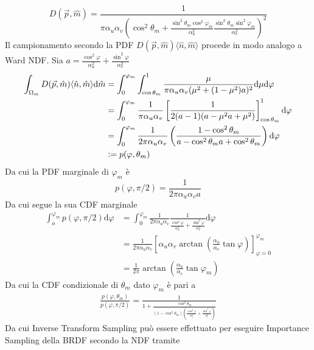 \begin{equation}
	D(\vec{p},\hat{m})=\frac{1}%
	{\pi\alpha_u\alpha_v\left(\cos^2\theta_m+\frac{\sin^2\theta_m\cos^2\varphi_m}{\alpha_u^2}\frac{\sin^2\theta_m\sin^2\varphi_m}{\alpha_v^2}\right)^2}
\end{equation}
Il campionamento secondo la PDF $D(\vec{p},\hat{m})\langle\hat{n},\hat{m}\rangle$ procede in modo analogo a Ward NDF. Sia 
\mbox{$a=\frac{\cos^2\varphi}{\alpha_u^2}+\frac{\sin^2\varphi}{\alpha_v^2}$}
\begin{align}
	\int_{\Omega_m}D(\vec{p},\hat{m})\langle\hat{n},\hat{m}\rangle\mathrm{d}\hat{m}&=%
	\int_0^{\varphi_m}\int_{\cos\theta_m}^1\frac{\mu}{\pi\alpha_u\alpha_v(\mu^2+(1-\mu^2)a)^2}\mathrm{d}\mu\mathrm{d}\varphi \nonumber \\
	&=\int_0^{\varphi_m}\frac{1}{\pi\alpha_u\alpha_v}\left[\frac{1}{2(a-1)(a-\mu^2a+\mu^2)}\right]_{\cos\theta_m}^1\mathrm{d}\varphi \nonumber \\
	&=\int_0^{\varphi_m}\frac{1}{2\pi\alpha_u\alpha_v}\left(\frac{1-\cos^2\theta_m}{a-\cos^2\theta_ma+\cos^2\theta_m}\right)\mathrm{d}\varphi%
		\nonumber\\
	&\vcentcolon=p(\varphi,\theta_m)
\end{align}
Da cui la PDF marginale di $\varphi_m$ \`e
\begin{equation}
	p(\varphi,\pi/2)=\frac{1}{2\pi\alpha_u\alpha_va}
\end{equation}
Da cui segue la sua CDF marginale
\begin{align}
	\int_o^{\varphi_m}p(\varphi,\pi/2)\mathrm{d}\varphi&=\int_0^{\varphi_m}%
		\frac{1}{2\pi\alpha_u\alpha_v}\frac{1}{\frac{\cos^2\varphi}{\alpha_u^2}+\frac{\sin^2\varphi}{\alpha_v^2}}\mathrm{d}\varphi\nonumber\\
		&=\frac{1}{2\pi\alpha_u\alpha_v}\left[\alpha_u\alpha_v\arctan\left(\frac{\alpha_u}{\alpha_v}\tan\varphi\right)\right]_{\varphi=0}^{\varphi_m}%
			\nonumber\\
		&=\frac{1}{2\pi}\arctan\left(\frac{\alpha_u}{\alpha_v}\tan\varphi_m\right)
\end{align}
Da cui la CDF condizionale di $\theta_m$ dato $\varphi_m$ \`e pari a 
\begin{align}
	\frac{p(\varphi,\theta_m)}{p(\varphi,\pi/2)}=\frac{1}{1+\frac{\cos^2\theta_m}%
		{(1-\cos^2\theta_m)\left(\frac{\cos^2\varphi}{\alpha_u^2}+\frac{\sin^2\varphi}{\alpha_v^2}\right)}}
\end{align}
Da cui Inverse Transform Sampling pu\`o essere effettuato per eseguire Importance Sampling della BRDF secondo la NDF tramite

